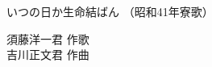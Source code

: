 \documentclass[10pt,b5j]{tarticle} %
\begin{document}
\begin{minipage}[c]{0.7\hsize} %
    \begin{center}
        {\LARGE
            いつの日か生命結ばん %
        }
        {\small 
            （昭和41年寮歌） %
        }
    \end{center}
\end{minipage}
\begin{minipage}[c]{0.3\hsize} %
    \begin{flushright} %
        須藤洋一君 作歌\\吉川正文君 作曲 %
    \end{flushright}
\end{minipage}
\end{document}
